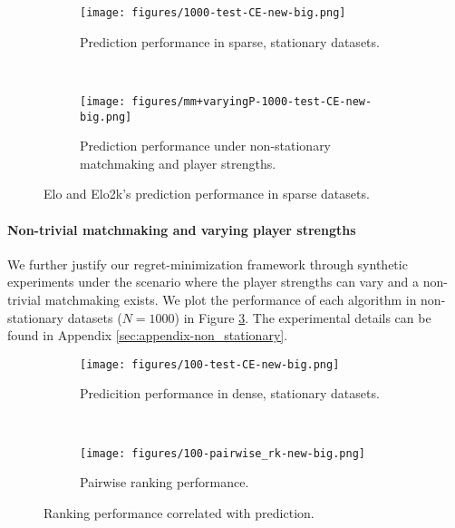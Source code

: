 \begin{figure}[t]
    \centering
    \begin{subfigure}[t]{0.48\textwidth} %
        \centering
        \texttt{[image: figures/1000-test-CE-new-big.png]}
        \caption{Prediction performance in sparse, stationary datasets.}
        \label{fig:synthetic-CE-N=1000}
    \end{subfigure}%
    ~
    \begin{subfigure}[t]{0.48\textwidth} %
        \centering
        \texttt{[image: figures/mm+varyingP-1000-test-CE-new-big.png]}
        \caption{Prediction performance under non-stationary matchmaking and player strengths.}
        \label{fig:synthetic-CE-N=1000+mm+varyingP}
    \end{subfigure}%
    \caption{Elo and Elo2k's prediction performance in sparse datasets.}
\end{figure}




\paragraph{Non-trivial matchmaking and varying player strengths}

We further justify our regret-minimization framework through synthetic experiments under the scenario where the player strengths can vary and a non-trivial matchmaking exists. We plot the performance of each algorithm in non-stationary datasets ($N=1000$) in Figure \ref{fig:synthetic-CE-N=1000+mm+varyingP}. The experimental details can be found in Appendix \ref{sec:appendix-non_stationary}. 


\begin{figure}[t]
    \centering

    \begin{subfigure}[t]{0.48\textwidth} %
        \centering
        \texttt{[image: figures/100-test-CE-new-big.png]}
        \caption{Predicition performance in dense, stationary datasets.}
        \label{fig:synthetic-CE-N=100}
    \end{subfigure}
    ~
    \begin{subfigure}[t]{0.48\textwidth} %
        \centering
        \texttt{[image: figures/100-pairwise\_rk-new-big.png]}
        \caption{Pairwise ranking performance.}
        \label{fig:pairwise-rk-N=100}
    \end{subfigure}
    \caption{Ranking performance correlated with prediction.}
\end{figure}

